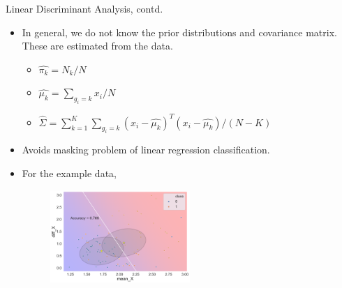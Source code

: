 \documentclass[aspectratio=169]{beamer}
\begin{document}
\begin{frame}{Linear Discriminant Analysis, contd.}
    \begin{itemize}
        \item In general, we do not know the prior distributions and covariance matrix. These are estimated from the data.
        \begin{itemize}
            \item $\hat{\pi_k} = N_k/N$
            \item $\hat{\mu_k} = \sum_{g_i=k} x_i / N$
            \item $\hat{\Sigma} = \sum_{k=1}^K \sum_{g_i=k} (x_i - \hat{\mu_k})^T(x_i - \hat{\mu_k}) / (N - K)$
        \end{itemize}
        \item Avoids masking problem of linear regression classification.
        \item For the example data,
        \begin{figure}
            \centering
            \includegraphics[width=0.5\textwidth]{figures/lda_metal_insulator.png}
        \end{figure}
    \end{itemize}
\end{frame}
\end{document}
